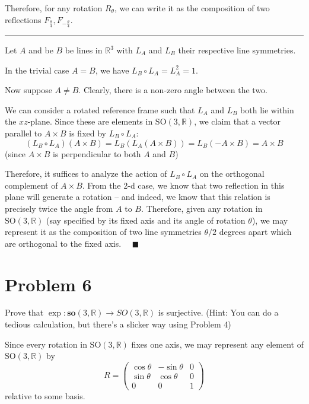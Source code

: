 \documentclass[12pt]{article}
\newcommand{\R}{\mathbb{R}}
\newcommand{\SO}{\text{SO}}
\newcommand{\lra}{\longrightarrow}
\newcommand{\qed}{\quad \blacksquare}
\begin{document}
        Therefore, for any rotation $R_{\theta}$, we can write it as the composition of two reflections $F_{\frac{\theta}{4}}, F_{-\frac{\theta}{4}}$.

        \vspace*{10pt}
        \hrule
        \vspace*{10pt}

        Let $A$ and be $B$ be lines in $\R^3$ with $L_A$ and $L_B$ their respective line symmetries. 

        In the trivial case $A = B$, we have $L_B \circ L_A = L_A^2 = 1$. 

        Now suppose $A \neq B$. Clearly, there is a non-zero angle between the two. 

        We can consider a rotated reference frame such that $L_A$ and $L_B$ both lie within the $xz$-plane. Since these are elements in $\SO(3, \R)$, we claim that a vector parallel to $A \times B$ is fixed by $L_B \circ L_A$: 
        \[(L_B \circ L_A)(A \times B) = L_B(L_A(A \times B)) = L_B(-A \times B) = A \times B\]
        (since $A\times B$ is perpendicular to both $A$ and $B$)

        Therefore, it suffices to analyze the action of $L_B \circ L_A$ on the orthogonal complement of $A \times B$. From the 2-d case, we know that two reflection in this plane will generate a rotation -- and indeed, we know that this relation is precisely twice the angle from $A$ to $B$. Therefore, given any rotation in $\SO(3, \R)$ (say specified by its fixed axis and its angle of rotation $\theta$), we may represent it as the composition of two line symmetries $\theta/2$ degrees apart which are orthogonal to the fixed axis. $\qed$ 
        
    \color{black}

\pagebreak

\section*{Problem 6} Prove that $\exp: \textbf{so}(3,\R) \lra SO(3,\R)$ is surjective.  (Hint: You can do a tedious calculation, but there's a slicker way using Problem 4)

    \color{blue}
        Since every rotation in $\SO(3, \R)$ fixes one axis, we may represent any element of $\SO(3, \R)$ by 
        \[R = \begin{pmatrix}
            \cos \theta & -\sin \theta & 0\\ 
            \sin \theta & \cos \theta & 0\\ 
            0 & 0 & 1
        \end{pmatrix}\]
        relative to some basis. 
\end{document}
